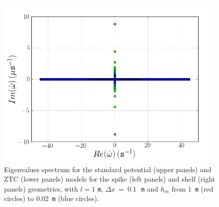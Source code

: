 \begin{figure}
\begin{center}
\includegraphics[type=png,ext=.png,read=.png,width=\smallfig]{chapters/lopes/png/L_1_dx_0.1_hm_shelf_spectrum_Zhao}
\end{center}
\caption{Eigenvalues spectrum for the standard potential
 (upper panels) and ZTC (lower panels)
 models for the spike (left panels) and
 shelf (right panels) geometries, with  $l=1$ {\tt m},
 $\Delta x~=~0.1$\,~{\tt m} and $h_m$ from $1$~{\tt m} (red circles)
 to $0.02$~{\tt m} (blue circles).}
 \label{fig:lopes:spectrumhm2}
 \end{figure}

